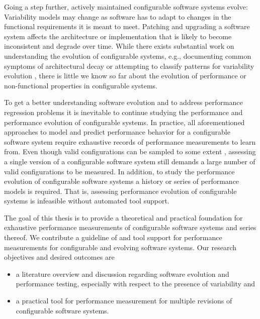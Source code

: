 Going a step further, actively maintained configurable software systems evolve:
Variability models may change as software has to adapt to changes in the
functional requirements it is meant to meet. Patching and upgrading a software
system affects the architecture or implementation that is likely to become
inconsistent and degrade over time. While there exists substantial work on
understanding the evolution of configurable systems, e.g., documenting common
symptoms of architectural decay
\citep{passos_feature_2015,zhang_variability_2013} or attempting to classify
patterns for variability evolution \citep{seidl_co-evolution_2012,peng_analyzing_2011,passos_towards_2012}, there is little we know so far about the evolution of performance or non-functional properties in configurable systems.

To get a better understanding software evolution and to address
performance regression problems it is inevitable to continue studying the
performance and performance evolution of configurable systems. In practice, all
aforementioned approaches to model and predict performance behavior for a
configurable software system require exhaustive records of performance
measurements to learn from. Even though valid configurations can be sampled to
some extent \citep{apel_feature-oriented_2013,siegmund_performance-influence_2015}, assessing a single version
of a configurable software system still demands a large number of valid configurations to be measured. In
addition, to study the performance evolution of configurable software systems a
history or series of performance models is required. That is, assessing
performance evolution of configurable systems is infeasible without
automated tool support.

The goal of this thesis is to provide a theoretical and practical foundation for
exhaustive performance measurements of configurable software systems and series
thereof. We contribute a guideline of and tool support for performance
measurements for configurable and evolving software systems. Our research
objectives and desired outcomes are

\begin{itemize}
\item a literature overview and discussion regarding software evolution and
performance testing, especially with respect to the presence of variability and 
\item a practical tool for performance measurement for multiple revisions of
configurable software systems.
\end{itemize}


